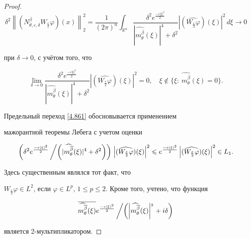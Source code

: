 \begin{proof}
\begin{equation}
 \delta^2\left\|(N_{\theta,\varepsilon,\delta}^{\overline{\beta}}W_{\frac\varepsilon 2}\varphi)(x)\right\|_2^2=

 \frac{1}{(2\pi)^{n}}\int_{{\mathbb R^n}} \frac{\delta^2 e^\frac{-\varepsilon|\xi|^2}2}{|\widehat{m_{\theta}^{\overline{\beta}}}(\xi)|^4+\delta^2}

  \left|(\widehat{W_{\frac\varepsilon 2}\varphi})(\xi)\right|^2 \, d\xi \to 0

\end{equation}

при $\delta\to 0$, с учётом того, что

\[

 \lim\limits_{\delta\to

  0}\frac{\delta^2 e^\frac{-\varepsilon|\xi|^2}2}{|\widehat{m_{\theta}^{\overline{\beta}}}(\xi)|^4+\delta^2}

  \left|(\widehat{W_{\frac\varepsilon 2}\varphi})(\xi)\right|^2=0,\quad

  \xi\not\in \{\xi:\ \widehat{m_{\theta}^{\overline{\beta}}}(\xi)=0\}.

\]

Предельный переход \eqref{4.861} обосновывается применением

мажорантной теоремы Лебега с учетом оценки

\[

\left({\delta^2

e^\frac{-\varepsilon|\xi|^2}2}\left/\left({|\widehat{m_{\theta}^{\overline{\beta}}}(\xi)|^4+\delta^2}

\right)\right)\right.

\left|(\widehat{W_{\frac\varepsilon 2}\varphi})(\xi)\right|^2

\leqslant e^\frac{-\varepsilon|\xi|^2}2

\left|(\widehat{W_{\frac\varepsilon 2}\varphi})(\xi)\right|^2 \in

L_1.

\]

Здесь существенным являлся тот факт, что

$W_{\frac\varepsilon 2}\varphi\in L^2$, если $\varphi\in L^p$, $1\leq p\leq 2$. Кроме того, учтено, что функция

$${\overline{\widehat{m_{\theta}^{\overline{\beta}}}(\xi)}

 e^\frac{-\varepsilon|\xi|^2}2}\left/

 {\left(\left|\widehat{m_{\theta}^{\overline{\beta}}}(\xi)\right|^{_{_2}}+i\delta\right)}\right.$$ 

является 2-мультипликатором.

\end{proof}

